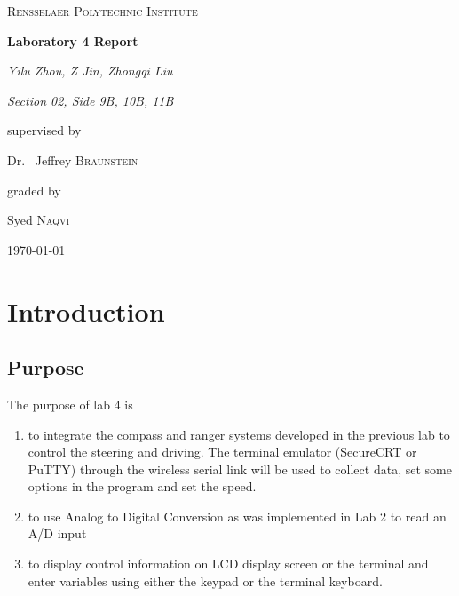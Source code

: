 \documentclass[12pt]{article}
\begin{document}
\begin{titlepage}
	\begin{center}
	{\scshape\LARGE{Rensselaer Polytechnic Institute}\par}
	\vspace{3.5cm}
	{\huge\bfseries{Laboratory 4 Report}\par}
	\vspace{2cm}
	{\Large\itshape{Yilu Zhou, Z Jin, Zhongqi Liu}\par}
    {\Large\itshape{Section 02, Side 9B, 10B, 11B}\par}
	\vfill
	supervised by\par
	Dr.~ Jeffrey \textsc{Braunstein}\par
    graded by\par
    Syed \textsc{Naqvi}
	\vfill
	{\large \today\par}
    \end{center}
\end{titlepage}
\section{Introduction}
\subsection{Purpose}
The purpose of lab 4 is
\begin{enumerate}
\item to integrate the compass and ranger systems developed in the previous lab to control the steering and driving. The terminal emulator (SecureCRT or PuTTY) through the wireless serial link will be used to collect data, set some options in the program and set the speed.
\item to use Analog to Digital Conversion as was implemented in Lab 2 to read an A/D input
\item to display control information on LCD display screen or the terminal and enter variables using either the keypad or the terminal keyboard.
\end{enumerate}
\end{document}
